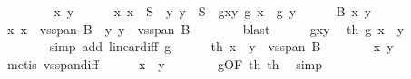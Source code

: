 \begin{isabellebody}
\ \ \isacommand{{\isacharbraceleft}{\kern0pt}}\isamarkupfalse%
\isanewline
\ \ \ \ \isamarkupfalse%
\ x\ y\isanewline
\ \ \ \ \isamarkupfalse%
\ x{\isacharcolon}{\kern0pt}\ {\isachardoublequoteopen}x\ {\isasymin}\ S{\isachardoublequoteclose}\ \ y{\isacharcolon}{\kern0pt}\ {\isachardoublequoteopen}y\ {\isasymin}\ S{\isachardoublequoteclose}\ \ gxy{\isacharcolon}{\kern0pt}\ {\isachardoublequoteopen}g\ x\ {\isacharequal}{\kern0pt}\ g\ y{\isachardoublequoteclose}\isanewline
\ \ \ \ \isamarkupfalse%
\ B{\isacharparenleft}{\kern0pt}{}{\isacharparenright}{\kern0pt}\ x\ y\ \isamarkupfalse%
\ x{\isacharprime}{\kern0pt}{\isacharcolon}{\kern0pt}\ {\isachardoublequoteopen}x\ {\isasymin}\ vs{}{\isachardot}{\kern0pt}span\ B{\isachardoublequoteclose}\ \ y{\isacharprime}{\kern0pt}{\isacharcolon}{\kern0pt}\ {\isachardoublequoteopen}y\ {\isasymin}\ vs{}{\isachardot}{\kern0pt}span\ B{\isachardoublequoteclose}\isanewline
\ \ \ \ \ \ \isamarkupfalse%
\ blast{\isacharplus}{\kern0pt}\isanewline
\ \ \ \ \isamarkupfalse%
\ gxy\ \isamarkupfalse%
\ th{}{\isacharcolon}{\kern0pt}\ {\isachardoublequoteopen}g\ {\isacharparenleft}{\kern0pt}x\ {\isacharminus}{\kern0pt}\ y{\isacharparenright}{\kern0pt}\ {\isacharequal}{\kern0pt}\ {}{\isachardoublequoteclose}\isanewline
\ \ \ \ \ \ \isamarkupfalse%
\ {\isacharparenleft}{\kern0pt}simp\ add{\isacharcolon}{\kern0pt}\ linear{\isacharunderscore}{\kern0pt}diff\ g{\isacharparenright}{\kern0pt}\isanewline
\ \ \ \ \isamarkupfalse%
\ th{}{\isacharcolon}{\kern0pt}\ {\isachardoublequoteopen}x\ {\isacharminus}{\kern0pt}\ y\ {\isasymin}\ vs{}{\isachardot}{\kern0pt}span\ B{\isachardoublequoteclose}\isanewline
\ \ \ \ \ \ \isamarkupfalse%
\ x{\isacharprime}{\kern0pt}\ y{\isacharprime}{\kern0pt}\ \isamarkupfalse%
\ {\isacharparenleft}{\kern0pt}metis\ vs{}{\isachardot}{\kern0pt}span{\isacharunderscore}{\kern0pt}diff{\isacharparenright}{\kern0pt}\isanewline
\ \ \ \ \isamarkupfalse%
\ {\isachardoublequoteopen}x\ {\isacharequal}{\kern0pt}\ y{\isachardoublequoteclose}\isanewline
\ \ \ \ \ \ \isamarkupfalse%
\ g{}{\isacharbrackleft}{\kern0pt}OF\ th{}\ th{}{\isacharbrackright}{\kern0pt}\ \isamarkupfalse%
\ simp\isanewline
\ \ \isacommand{{\isacharbraceright}{\kern0pt}}\isamarkupfalse%

\end{isabellebody}
